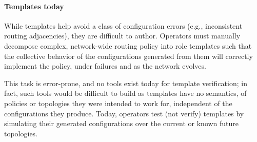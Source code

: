 \documentclass[numbers, 10pt, preprint]{sigplanconf}
\newcommand{\IE}{\emph{i.e.}}
\newcommand{\para}[1]{\paragraph*{\textbf{#1}}}
\begin{document}

\para{Templates today} While templates help avoid a class of configuration errors (e.g., inconsistent routing adjacencies), they are difficult to author. Operators must manually decompose complex, network-wide routing policy into role templates such that the collective behavior of the configurations generated from them will correctly implement the policy, under failures and as the network evolves.

This task is error-prone, and no tools exist today for template verification; in fact, such tools would be difficult to build as templates have no semantics, of policies or topologies they were intended to work for, independent of the configurations they produce. Today, operators test (not verify) templates by simulating their generated configurations over the current or known future topologies.

\end{document}
